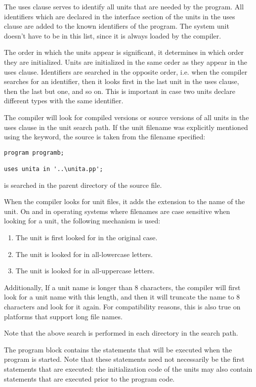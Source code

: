 The uses clause serves to identify all units that are needed by the program.
All identifiers which are declared in the interface section of the units
in the uses clause are added to the known identifiers of the program.
The system unit doesn't have to be in this list, since it is always loaded
by the compiler.

The order in which the units appear is significant, it determines in
which order they are initialized. Units are initialized in the same order
as they appear in the uses clause. Identifiers are searched in the opposite
order, i.e. when the compiler searches for an identifier, then it looks
first in the last unit in the uses clause, then the last but one, and so on.
This is important in case two units declare different types with the same
identifier.

The compiler will look for compiled versions or source versions of all 
units in the uses clause in the unit search path. If the unit filename was
explicitly mentioned using the  keyword, the source is taken from
the filename specified:
\begin{verbatim}
program programb;

uses unita in '..\unita.pp';
\end{verbatim}
 is searched in the parent directory of the  source
file.


When the compiler looks for unit files, it adds the extension 
to the name of the unit. On \linux and in operating systems where filenames 
are case sensitive  when looking for a unit, the following mechanism is
used:
\begin{enumerate}
\item The unit is first looked for in the original case.
\item The unit is looked for in all-lowercase letters.
\item The unit is looked for in all-uppercase letters.
\end{enumerate}
Additionally, If a unit name is longer than 8 characters, the compiler 
will first look for a unit name with this length, and then it will 
truncate the name to 8 characters and look for it again. 
For compatibility reasons, this is also true on platforms that 
support long file names.

Note that the above search is performed in each directory in the search
path. 

The program block contains the statements that will be executed when the
program is started. Note that these statements need not necessarily be the 
first statements that are executed: the initialization code of the units
may also contain statements that are executed prior to the program code.

